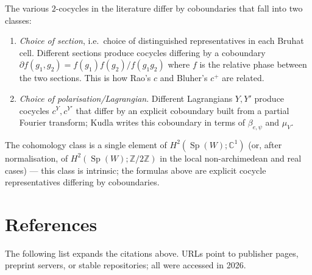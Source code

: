 \documentclass[11pt,letterpaper]{article}
\newcommand{\Sp}{\operatorname{Sp}}
\newcommand{\C}{\mathbb{C}}
\newcommand{\Z}{\mathbb{Z}}
\theoremstyle{plain}
\theoremstyle{definition}
\begin{document}
The various $2$-cocycles in the literature differ by coboundaries that fall into two classes:
\begin{enumerate}[leftmargin=2em,itemsep=2pt]
\item \emph{Choice of section}, i.e.\ choice of distinguished representatives in each Bruhat cell. Different sections produce cocycles differing by a coboundary $\partial f(g_1,g_2) = f(g_1)f(g_2)/f(g_1 g_2)$ where $f$ is the relative phase between the two sections. This is how Rao's $c$ and Bluher's $c^+$ are related.
\item \emph{Choice of polarisation/Lagrangian}. Different Lagrangians $Y, Y'$ produce cocycles $c^Y, c^{Y'}$ that differ by an explicit coboundary built from a partial Fourier transform; Kudla \cite[Ch.~II]{Kudla1996} writes this coboundary in terms of $\beta_{e,\psi}$ and $\mu_V$.
\end{enumerate}
The cohomology class is a single element of $H^2(\Sp(W);\C^1)$ (or, after normalisation, of $H^2(\Sp(W);\Z/2\Z)$ in the local non-archimedean and real cases) — this class is intrinsic; the formulas above are explicit cocycle representatives differing by coboundaries.

\section{References}

The following list expands the citations above. URLs point to publisher pages, preprint servers, or stable repositories; all were accessed in 2026.
\end{document}
